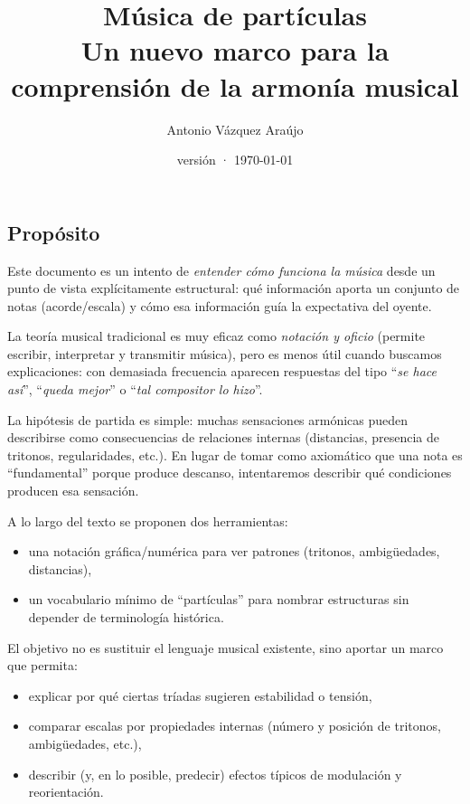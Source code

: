 \documentclass[]{report}
\title{Música de partículas \\[1ex] \large Un nuevo marco para la comprensión de la armonía musical}
\author{Antonio Vázquez Araújo}
\date{versión \docversion{} · \today}
\providecommand{\tightlist}{%
  \setlength{\itemsep}{0pt}
  \setlength{\parskip}{0pt}
}
\begin{document}
\maketitle
\tableofcontents


\subsection{Propósito}
Este documento es un intento de \emph{entender cómo funciona la música} desde un punto de vista explícitamente estructural: qué información aporta un conjunto de notas (acorde/escala) y cómo esa información guía la expectativa del oyente.

La teoría musical tradicional es muy eficaz como \emph{notación y oficio} (permite escribir, interpretar y transmitir música), pero es menos útil cuando buscamos explicaciones: con demasiada frecuencia aparecen respuestas del tipo ``\emph{se hace así}'', ``\emph{queda mejor}'' o ``\emph{tal compositor lo hizo}''.

La hipótesis de partida es simple: muchas sensaciones armónicas pueden describirse como consecuencias de relaciones internas (distancias, presencia de tritonos, regularidades, etc.). En lugar de tomar como axiomático que una nota es ``fundamental'' porque produce descanso, intentaremos describir qué condiciones producen esa sensación.

A lo largo del texto se proponen dos herramientas:
\begin{itemize}
	\tightlist%
	\item una notación gráfica/numérica para ver patrones (tritonos, ambigüedades, distancias),
	\item un vocabulario mínimo de ``partículas'' para nombrar estructuras sin depender de terminología histórica.
\end{itemize}

El objetivo no es sustituir el lenguaje musical existente, sino aportar un marco que permita:
\begin{itemize}
	\tightlist%
	\item explicar por qué ciertas tríadas sugieren estabilidad o tensión,
	\item comparar escalas por propiedades internas (número y posición de tritonos, ambigüedades, etc.),
	\item describir (y, en lo posible, predecir) efectos típicos de modulación y reorientación.
\end{itemize}
\end{document}
